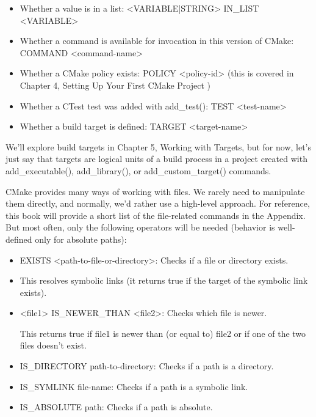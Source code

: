 \begin{itemize}
\item
Whether a value is in a list: <VARIABLE|STRING> IN\_LIST <VARIABLE>

\item
Whether a command is available for invocation in this version of CMake: COMMAND <command-name>

\item
Whether a CMake policy exists: POLICY <policy-id> (this is covered in Chapter 4, Setting Up Your First CMake Project )

\item
Whether a CTest test was added with add\_test(): TEST <test-name>

\item
Whether a build target is defined: TARGET <target-name>
\end{itemize}

We’ll explore build targets in Chapter 5, Working with Targets, but for now, let’s just say that targets are logical units of a build process in a project created with add\_executable(), add\_library(), or add\_custom\_target() commands.


CMake provides many ways of working with files. We rarely need to manipulate them directly, and normally, we’d rather use a high-level approach. For reference, this book will provide a short list of the file-related commands in the Appendix. But most often, only the following operators will be needed (behavior is well-defined only for absolute paths):

\begin{itemize}
\item
EXISTS <path-to-file-or-directory>: Checks if a file or directory exists.

\item
This resolves symbolic links (it returns true if the target of the symbolic link exists).

\item
<file1> IS\_NEWER\_THAN <file2>: Checks which file is newer.

This returns true if file1 is newer than (or equal to) file2 or if one of the two files doesn’t exist.

\item
IS\_DIRECTORY path-to-directory: Checks if a path is a directory.

\item
IS\_SYMLINK file-name: Checks if a path is a symbolic link.

\item
IS\_ABSOLUTE path: Checks if a path is absolute.
\end{itemize}


